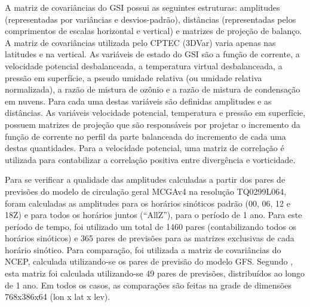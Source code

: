 A matriz de covariâncias do GSI possui as seguintes estruturas: amplitudes (representadas por variâncias e desvios-padrão), distâncias (representadas pelos comprimentos de escalas horizontal e vertical) e matrizes de projeção de balanço. A matriz de covariâncias utilizada pelo CPTEC (3DVar) varia apenas nas latitudes e na vertical. As variáveis de estado do GSI são a função de corrente, a velocidade potencial desbalanceada, a temperatura virtual desbalanceada, a pressão em superfície, a pseudo umidade relativa (ou umidade relativa normalizada), a razão de mistura de ozônio e a razão de mistura de condensação em nuvens. Para cada uma destas variáveis são definidas amplitudes e as distâncias. As variáveis velocidade potencial, temperatura e pressão em superfície, possuem matrizes de projeção que são responsáveis por projetar o incremento da função de corrente no perfil da parte balanceada do incremento de cada uma destas quantidades. Para a velocidade potencial, uma matriz de correlação é utilizada para contabilizar a correlação positiva entre divergência e vorticidade.

Para se verificar a qualidade das amplitudes calculadas a partir dos pares de previsões do modelo de circulação geral MCGAv4 na resolução TQ0299L064, foram calculadas as amplitudes para os horários sinóticos padrão (00, 06, 12 e 18Z) e para todos os horários juntos (``AllZ''), para o período de 1 ano. Para este período de tempo, foi utilizado um total de 1460 pares (contabilizando todos os horários sinóticos) e 365 pares de previsões para as matrizes exclusivas de cada horário sinótico. Para comparação, foi utilizada a matriz de covariâncias do NCEP, calculada utilizando-se os pares de previsão do modelo GFS. Segundo , esta matriz foi calculada utilizando-se 49 pares de previsões, distribuídos ao longo de 1 ano. Em todos os casos, as comparações são feitas na grade de dimensões 768x386x64 (lon x lat x lev).

